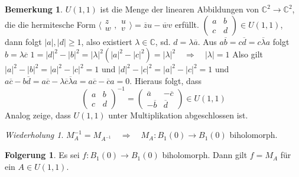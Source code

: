\documentclass[11pt,titlepage]{article}
\theoremstyle{definition}
\newtheorem{corollary}[theorem]{Folgerung}
\newtheorem{remark}[theorem]{Bemerkung}
\theoremstyle{remark}
\newtheorem*{repetition}{Wiederholung}
\begin{document}
	\begin{remark}
		$U(1,1)$ ist die Menge der linearen Abbildungen von $\mathbb{C}^2\to\mathbb{C}^2$, 
		die die hermitesche Form $\langle \begin{smallmatrix}z\\w\end{smallmatrix},
		\begin{smallmatrix}u\\v\end{smallmatrix}\rangle =\overline{z}u-\overline{w}v$ erfüllt. 
		$\left( \begin{smallmatrix}a&b\\c&d\end{smallmatrix} \right) \in U(1,1)$, dann folgt 
		$|a|,|d|\geq 1$, also existiert $\lambda\in\mathbb{C}$, sd. $d=\lambda\overline{a}$. 
		Aus $a\overline{b}=c\overline{d}=c\overline{\lambda} a$ folgt $b=\lambda\overline{c}$ 
		$1=|d|^2 -|b|^2 =|\lambda |^2 (|a|^2 -|c|^2 )=|\lambda |^2 \quad \Rightarrow \quad |\lambda|=1$ 
		Also gilt $|a|^2 -|b|^2 =|a|^2 -|c|^2 =1$ und $|d|^2 -|c|^2 =|a|^2 -|c|^2 =1$ und $a\overline{c} -
		b\overline{d}=a\overline{c} -\lambda \overline{c}\overline{\lambda}a=a\overline{c} - 
		\overline{c}a=0$. 
		Hieraus folgt, dass 
		\[ \begin{pmatrix} a&b \\ c&d \end{pmatrix}^{-1} = \begin{pmatrix} \overline{a} & -\overline{c} \\
		-\overline{b} & \overline{d} \end{pmatrix} \in U(1,1) \]
		Analog zeige, dass $U(1,1)$ unter Multiplikation abgeschlossen ist.
	\end{remark}
	
	\begin{repetition}
		$M_{A}^{-1} =M_{A^{-1}} \quad\Rightarrow\quad M_A :B_1(0)\to B_1(0)$ biholomorph.
	\end{repetition}
	
	\begin{corollary} \label{coroll:moebius}
		Es sei $f:B_1(0)\to B_1(0)$ biholomorph. Dann gilt $f=M_A$ für ein $A\in U(1,1)$.
	\end{corollary}
	
\end{document}
